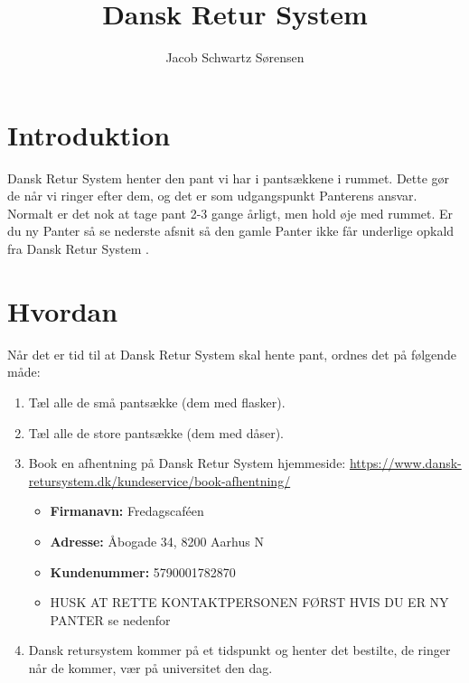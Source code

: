 

\title{Dansk Retur System}
\date{}
\author{Jacob Schwartz Sørensen}



\maketitle

\newcommand{\DRS}{Dansk Retur System }

\section{Introduktion}
\label{sec:Introduktion}

\DRS henter den pant vi har i pantsækkene i rummet. Dette gør de når vi ringer efter dem, og det er som udgangspunkt Panterens ansvar.
Normalt er det nok at tage pant 2-3 gange årligt, men hold øje med rummet.
Er du ny Panter så se nederste afsnit så den gamle Panter ikke får underlige opkald fra \DRS.

\section{Hvordan}
\label{sec:Hvordan}

Når det er tid til at \DRS skal hente pant, ordnes det på følgende måde:

\begin{enumerate}
	\item Tæl alle de små pantsække (dem med flasker).
	\item Tæl alle de store pantsække (dem med dåser).
	\item Book en afhentning på \DRS hjemmeside: \url{https://www.dansk-retursystem.dk/kundeservice/book-afhentning/}
	\begin{itemize}
		\item \textbf{Firmanavn:} Fredagscaféen
		\item \textbf{Adresse:} Åbogade 34, 8200 Aarhus N
		\item \textbf{Kundenummer:} 5790001782870
		\item HUSK AT RETTE KONTAKTPERSONEN FØRST HVIS DU ER NY PANTER se nedenfor
	\end{itemize}
	\item Dansk retursystem kommer på et tidspunkt og henter det bestilte, de ringer når de kommer, vær på universitet den dag.
\end{enumerate}


